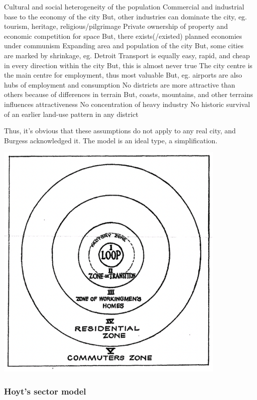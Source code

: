 \documentclass{article}
\begin{document}
\begin{outline}
	\1 Cultural and social heterogeneity of the population
	\1 Commercial and industrial base to the economy of the city
		\2 But, other industries can dominate the city, eg. tourism, heritage, religious/pilgrimage
	\1 Private ownership of property and economic competition for space
		\2 But, there exists(/existed) planned economies under communism
	\1 Expanding area and population of the city
		\2 But, some cities are marked by shrinkage, eg. Detroit
	\1 Transport is equally easy, rapid, and cheap in every direction within the city
		\2 But, this is almost never true
	\1 The city centre is the main centre for employment, thus most valuable
		\2 But, eg. airports are also hubs of employment and consumption
	\1 No districts are more attractive than others because of differences in terrain
		\2 But, coasts, mountains, and other terrains influences attractiveness 
	\1 No concentration of heavy industry
	\1 No historic survival of an earlier land-use pattern in any district
\end{outline}

Thus, it's obvious that these assumptions do not apply to any real city, and Burgess acknowledged it. The model is an ideal type, a simplification.

\begin{center}
\includegraphics[width=30em]{burgess_model}
\end{center}

\subsubsection{Hoyt's sector model}
\end{document}
